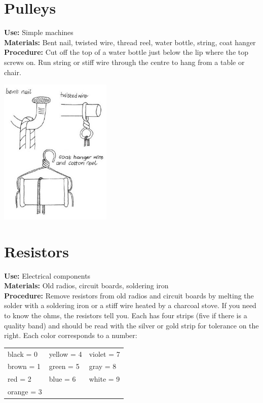 \begin{multicols}{2}
\section{Pulleys}
\label{sec:pulleys}
\vspace{-10pt}
\textbf{Use:} Simple machines\\
\textbf{Materials:} Bent nail, twisted wire, thread reel, water bottle, string, coat hanger\\
\textbf{Procedure:} Cut off the top of a water bottle just below the lip where the top screws on. Run string or stiff wire through the centre to hang from a table or chair.
\begin{center}
\includegraphics[width=0.4\textwidth]{./img/vso/pulleys.jpg}
\end{center}

\section{Resistors}
\label{sec:resistors}
\vspace{-10pt}
\textbf{Use:} Electrical components\\
\textbf{Materials:} Old radios, circuit boards, soldering iron\\
\textbf{Procedure:} Remove resistors from old radios and circuit boards by melting the solder with a soldering iron or a stiff wire heated by a charcoal stove. If you need to know the ohms, the resistors tell you. Each has four strips (five if there is a quality band) and should be read with the silver or gold strip for tolerance on the right. Each color corresponds to a number:\\[10pt]

\begin{tabular}{lll}
black = 0 & yellow = 4 & violet = 7\\
brown = 1 & green = 5 & gray = 8\\
red = 2 & blue = 6 & white = 9\\
orange = 3 & & \\[10pt]
\end{tabular} 


\end{multicols}
